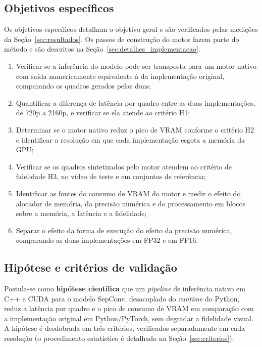 \documentclass[
    12pt,                %
    openright,           %
    oneside,             %
    a4paper,             %
    english,             %
    brazil               %
]{abntex2}
\begin{document}
\subsection{Objetivos específicos}

Os objetivos específicos detalham o objetivo geral e são verificados pelas medições da Seção~\ref{sec:resultados}. Os passos de construção do motor fazem parte do método e são descritos na Seção~\ref{sec:detalhes_implementacao}.

\begin{enumerate}
    \item Verificar se a inferência do modelo pode ser transposta para um motor nativo com saída numericamente equivalente à da implementação original, comparando os quadros gerados pelas duas;
    \item Quantificar a diferença de latência por quadro entre as duas implementações, de 720p a 2160p, e verificar se ela atende ao critério H1;
    \item Determinar se o motor nativo reduz o pico de VRAM conforme o critério H2 e identificar a resolução em que cada implementação esgota a memória da GPU;
    \item Verificar se os quadros sintetizados pelo motor atendem ao critério de fidelidade H3, no vídeo de teste e em conjuntos de referência;
    \item Identificar as fontes do consumo de VRAM do motor e medir o efeito do alocador de memória, da precisão numérica e do processamento em blocos sobre a memória, a latência e a fidelidade;
    \item Separar o efeito da forma de execução do efeito da precisão numérica, comparando as duas implementações em FP32 e em FP16.
\end{enumerate}

\subsection{Hipótese e critérios de validação}
\label{sec:hipotese}

Postula-se como \textbf{hipótese científica} que um \textit{pipeline} de inferência nativo em C++ e CUDA para o modelo SepConv, desacoplado do \textit{runtime} do Python, reduz a latência por quadro e o pico de consumo de VRAM em comparação com a implementação original em Python/PyTorch, sem degradar a fidelidade visual. A hipótese é desdobrada em três critérios, verificados separadamente em cada resolução (o procedimento estatístico é detalhado na Seção~\ref{sec:criterios}):
\end{document}
